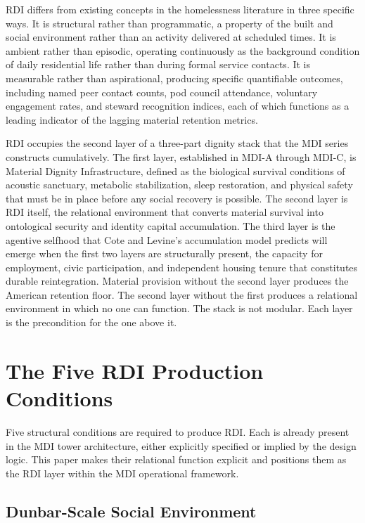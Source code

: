 \documentclass[12pt, letterpaper]{article}
\begin{document}
RDI differs from existing concepts in the homelessness literature in three specific ways. It is structural rather than programmatic, a property of the built and social environment rather than an activity delivered at scheduled times. It is ambient rather than episodic, operating continuously as the background condition of daily residential life rather than during formal service contacts. It is measurable rather than aspirational, producing specific quantifiable outcomes, including named peer contact counts, pod council attendance, voluntary engagement rates, and steward recognition indices, each of which functions as a leading indicator of the lagging material retention metrics.

RDI occupies the second layer of a three-part dignity stack that the MDI series constructs cumulatively. The first layer, established in MDI-A through MDI-C, is Material Dignity Infrastructure, defined as the biological survival conditions of acoustic sanctuary, metabolic stabilization, sleep restoration, and physical safety that must be in place before any social recovery is possible. The second layer is RDI itself, the relational environment that converts material survival into ontological security and identity capital accumulation. The third layer is the agentive selfhood that Cote and Levine's accumulation model predicts will emerge when the first two layers are structurally present, the capacity for employment, civic participation, and independent housing tenure that constitutes durable reintegration. Material provision without the second layer produces the American retention floor. The second layer without the first produces a relational environment in which no one can function. The stack is not modular. Each layer is the precondition for the one above it.

\clearpage
\section{The Five RDI Production Conditions}

Five structural conditions are required to produce RDI. Each is already present in the MDI tower architecture, either explicitly specified or implied by the design logic. This paper makes their relational function explicit and positions them as the RDI layer within the MDI operational framework.

\subsection{Dunbar-Scale Social Environment}
\end{document}
